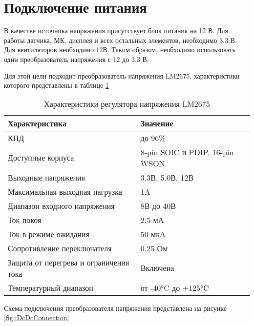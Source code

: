 \section {Подключение питания}

В качестве источника напряжения присутствует блок питания на 12 В. Для работы датчика, МК, дисплея и всех остальных элементов, необходимо 3.3 В. Для вентиляторов необходимо 12В. Таким образом, необходимо использовать один преобразователь напряжения с 12 до 3.3 В. 

Для этой цели подходит преобразователь напряжения LM2675, характеристики которого представлены в таблице \ref{tab::DcDcConverter}

\begin{table}[h!]
	\centering
	\caption{Характеристики регулятора напряжения LM2675}
	\begin{tabular}{| m{6cm} | m{8cm} |}
		\hline
		\textbf{Характеристика} & \textbf{Значение} \\ \hline
		КПД & до 96\% \\ \hline
		Доступные корпуса & 8-pin SOIC и PDIP, 16-pin WSON \\ \hline
		Выходные напряжения & 3.3В, 5.0В, 12В \\ \hline
		Максимальная выходная нагрузка & 1A \\ \hline
		Диапазон входного напряжения & 8В до 40В \\ \hline
		Ток покоя & 2.5 мА \\ \hline
		Ток в режиме ожидания & 50 мкА \\ \hline
		Сопротивление переключателя & 0.25 Ом \\ \hline
		Защита от перегрева и ограничения тока & Включена \\ \hline
		Температурный диапазон & от -40°C до +125°C \\ \hline
	\end{tabular}
	\label{tab::DcDcConverter}
\end{table}

Схема подключения преобразователя напряжения представлена на рисунке \ref{fig::DcDcConnection}

